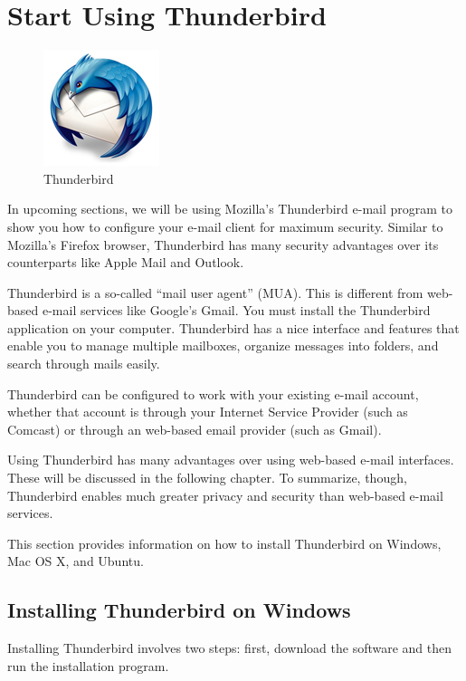 \section{Start Using Thunderbird}

\begin{figure}[htbp]
\centering
\includegraphics{thunderbird.jpg}
\caption{Thunderbird}
\end{figure}

In upcoming sections, we will be using Mozilla's Thunderbird e-mail
program to show you how to configure your e-mail client for maximum
security. Similar to Mozilla's Firefox browser, Thunderbird has many
security advantages over its counterparts like Apple Mail and Outlook.

Thunderbird is a so-called ``mail user agent'' (MUA). This is different
from web-based e-mail services like Google's Gmail. You must install the
Thunderbird application on your computer. Thunderbird has a nice
interface and features that enable you to manage multiple mailboxes,
organize messages into folders, and search through mails easily.

Thunderbird can be configured to work with your existing e-mail account,
whether that account is through your Internet Service Provider (such as
Comcast) or through an web-based email provider (such as Gmail).

Using Thunderbird has many advantages over using web-based e-mail
interfaces. These will be discussed in the following chapter. To
summarize, though, Thunderbird enables much greater privacy and security
than web-based e-mail services.

This section provides information on how to install Thunderbird on
Windows, Mac OS X, and Ubuntu.

\subsection{Installing Thunderbird on Windows}

Installing Thunderbird involves two steps: first, download the software
and then run the installation program.

